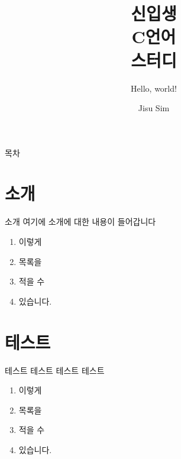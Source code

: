 \documentclass[aspectratio=169]{beamer}
\title{신입생\\\textbf{C언어}\\스터디}
\subtitle{Hello, world!}
\author{Jisu Sim}
\institute{소프트웨어학과 소학회 A.N.S.I.}
\begin{document}
\begin{frame}[plain]
    \titlepage
\end{frame}

\begin{frame}{목차}
    \tableofcontents
\end{frame}

\section{소개}

\begin{frame}[plain]
    \sectionpage
\end{frame}

\begin{frame}{소개}
    여기에 소개에 대한 내용이 들어갑니다
    \begin{enumerate}
        \item 이렇게
        \item 목록을
        \item 적을 수
        \item 있습니다.
    \end{enumerate}
\end{frame}

\section{테스트}

\begin{frame}[plain]
    \sectionpage
\end{frame}

\begin{frame}{테스트}
    테스트 테스트 테스트
    \begin{enumerate}
        \item 이렇게
        \item 목록을
        \item 적을 수
        \item 있습니다.
    \end{enumerate}
\end{frame}
\end{document}
